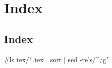 \documentclass[12pt]{article}
\begin{document}
\maketitle

\section{Index}
\subsection{Index}
\tableofcontents
\newpage

#ls tex/*.tex | sort | sed -re's/^/\/g'
\end{document}
